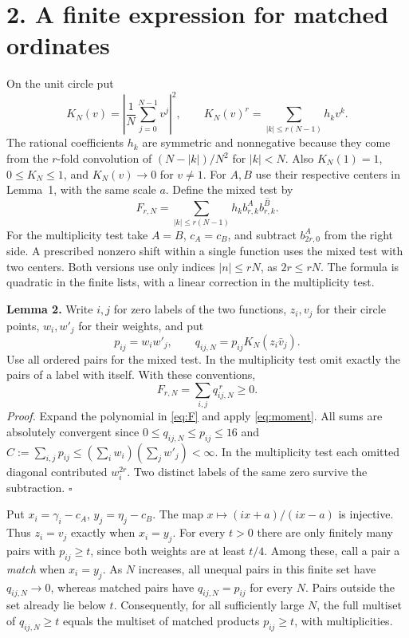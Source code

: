 \documentclass[11pt,letterpaper]{article}
\newcommand{\HH}[1]{\section*{\color{ink}#1}}
\newcommand{\subt}[1]{\par\smallskip{\sffamily\bfseries\color{teal}#1}\par\nobreak}
\begin{document}
\newpage
\HH{2. A finite expression for matched ordinates}
On the unit circle put
\[
 K_N(v)=\left|\frac1N\sum_{j=0}^{N-1}v^j\right|^2,\qquad
 K_N(v)^r=\sum_{|k|\le r(N-1)}h_kv^k .
\]
The rational coefficients $h_k$ are symmetric and nonnegative because they come
from the $r$-fold convolution of $(N-|k|)/N^2$ for $|k|<N$.
Also $K_N(1)=1$, $0\le K_N\le1$, and $K_N(v)\to0$ for $v\ne1$.
For $A,B$ use their respective centers in Lemma~1, with the same scale $a$.
Define the mixed test by
\begin{equation}
 F_{r,N}=\sum_{|k|\le r(N-1)}h_k b^A_{r,k}\overline{b^B_{r,k}} .
 \label{eq:F}
\end{equation}
For the multiplicity test take $A=B$, $c_A=c_B$, and subtract $b^A_{2r,0}$
from the right side. A prescribed nonzero shift within a single function uses
the mixed test with two centers. Both versions use only indices $|n|\le rN$,
as $2r\le rN$. The formula is quadratic in the finite lists, with a linear
correction in the multiplicity test.

\textbf{Lemma 2.} Write $i,j$ for zero labels of the two functions, $z_i,v_j$
for their circle points, $w_i,w'_j$ for their weights, and put
\[
 p_{ij}=w_iw'_j,\qquad q_{ij,N}=p_{ij}K_N(z_i\bar v_j).
\]
Use all ordered pairs for the mixed test. In the multiplicity test omit
exactly the pairs of a label with itself. With these conventions,
\begin{equation}
                  F_{r,N}=\sum_{i,j}q_{ij,N}^{\,r}\ge0.
 \label{eq:pairs}
\end{equation}
\emph{Proof.} Expand the polynomial in \eqref{eq:F} and apply \eqref{eq:moment}.
All sums are absolutely convergent since $0\le q_{ij,N}\le p_{ij}\le16$ and
$C:=\sum_{i,j}p_{ij}\le(\sum_iw_i)(\sum_jw'_j)<\infty$.
In the multiplicity test each omitted diagonal contributed $w_i^{2r}$.
Two distinct labels of the same zero survive the subtraction. \hfill$\square$

\subt{What a fixed angular resolution preserves}
Put $x_i=\gamma_i-c_A$, $y_j=\eta_j-c_B$. The map
$x\mapsto (ix+a)/(ix-a)$ is injective. Thus $z_i=v_j$ exactly when $x_i=y_j$.
For every $t>0$ there are only finitely many pairs with $p_{ij}\ge t$,
since both weights are at least $t/4$. Among these, call a pair a
\emph{match} when $x_i=y_j$. As $N$ increases, all unequal pairs in this
finite set have $q_{ij,N}\to0$, whereas matched pairs have $q_{ij,N}=p_{ij}$
for every $N$. Pairs outside the set already lie below $t$. Consequently,
for all sufficiently large $N$, the full multiset of $q_{ij,N}\ge t$
equals the multiset of matched products $p_{ij}\ge t$, with multiplicities.
\end{document}
